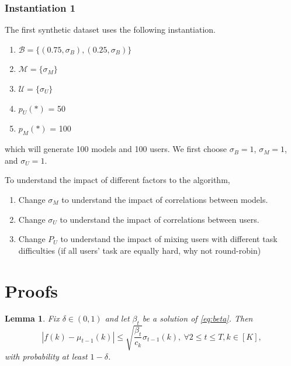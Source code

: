 \documentclass[letterpaper]{vldb}
\newtheorem{lemma}[theorem]{Lemma}
\begin{document}
\subsubsection{Instantiation 1}

The first synthetic dataset uses the following instantiation.

\begin{enumerate}
\item $\mathcal{B} = \{(0.75, \sigma_{B}), (0.25, \sigma_{B})\}$
\item $\mathcal{M} = \{\sigma_{M}\}$
\item $\mathcal{U} = \{\sigma_U\}$
\item $p_U(*)$ = 50
\item $p_M(*)$ = 100
\end{enumerate}
which will generate 100 models and 100 users. We first
choose $\sigma_{B} = 1$, $\sigma_{M} = 1$, and $\sigma_{U} = 1$.

To understand the impact of different factors to the algorithm,
\begin{enumerate}
\item Change $\sigma_{M}$ to understand the impact of
correlations between models.
\item Change $\sigma_{U}$ to understand the impact of
correlations between users.
\item Change $P_U$ to understand the impact of
mixing users with different task difficulties (if all users' task are
equally hard, why not round-robin)
\end{enumerate}

\section{Proofs}
\begin{lemma}
  \label{lem:5.1}
  Fix $\delta \in (0,1)$ and let $\beta_t $ be a solution of \eqref{eq:beta}. Then
  \[
    |f(k) - \mu_{t-1}(k) | \le \sqrt{\frac{\beta_t}{c_k}}\sigma_{t-1}(k),\
    \forall 2\le t\le T, k\in [K],
  \]
  with probability at least $1-\delta$.
\end{lemma}
\end{document}
